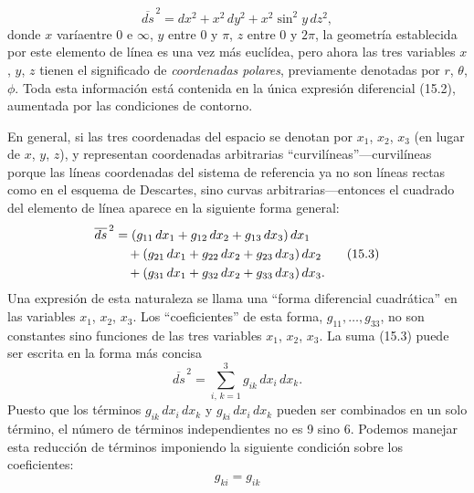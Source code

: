 \documentclass[12pt,a4paper]{book}
\begin{document}
\begin{center}
\begin{equation}
\overline{ds}^{\,2} = dx^2 + x^2\,dy^2 + x^2 \sin^2 y\,dz^2,
\tag{15.2}
\end{equation}
donde $x$ var\'ia\footnotemark[1] entre 0 e $\infty$, $y$ entre 0 y $\pi$, $z$ entre 0 y $2\pi$, la geometr\'ia establecida por este elemento de l\'inea es una vez m\'as eucl\'idea, pero ahora las tres variables $x$, $y$, $z$ tienen el significado de \textit{coordenadas polares}, previamente denotadas por $r$, $\theta$, $\phi$. Toda esta informaci\'on est\'a contenida en la \'unica expresi\'on diferencial (15.2), aumentada por las condiciones de contorno.


En general, si las tres coordenadas del espacio se denotan por $x_1$, $x_2$, $x_3$ (en lugar de $x$, $y$, $z$), y representan coordenadas arbitrarias ``curvil\'ineas''---curvil\'ineas porque las l\'ineas coordenadas del sistema de referencia ya no son l\'ineas rectas como en el esquema de Descartes, sino curvas arbitrarias---entonces el cuadrado del elemento de l\'inea aparece en la siguiente forma general:
\begin{align}
\overline{ds}^{\,2} &= (g_{11}\,dx_1 + g_{12}\,dx_2 + g_{13}\,dx_3)\,dx_1 \notag\\
&\quad + (g_{21}\,dx_1 + g_{22}\,dx_2 + g_{23}\,dx_3)\,dx_2 \tag{15.3}\\
&\quad + (g_{31}\,dx_1 + g_{32}\,dx_2 + g_{33}\,dx_3)\,dx_3. \notag
\end{align}
Una expresi\'on de esta naturaleza se llama una ``forma diferencial cuadr\'atica'' en las variables $x_1$, $x_2$, $x_3$. Los ``coeficientes'' de esta forma, $g_{11}, \ldots, g_{33}$, no son constantes sino funciones de las tres variables $x_1$, $x_2$, $x_3$. La suma (15.3) puede ser escrita en la forma m\'as concisa
\begin{equation}
\overline{ds}^{\,2} = \sum_{i,\,k=1}^{3} g_{ik}\,dx_i\,dx_k.
\tag{15.4}
\end{equation}
Puesto que los t\'erminos $g_{ik}\,dx_i\,dx_k$ y $g_{ki}\,dx_i\,dx_k$ pueden ser combinados en un solo t\'ermino, el n\'umero de t\'erminos independientes no es 9 sino 6. Podemos manejar esta reducci\'on de t\'erminos imponiendo la siguiente condici\'on sobre los coeficientes:
\begin{equation}
g_{ki} = g_{ik}
\tag{15.5}
\end{equation}


\end{center}
\end{document}
